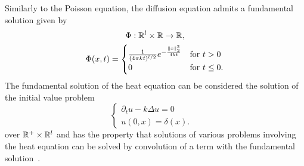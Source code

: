 Similarly to the Poisson equation, the diffusion equation admits a fundamental solution given by
\[
    \begin{gathered}
        \Phi : \mathbb{R}^l \times \mathbb{R} \rightarrow \mathbb{R}, \\
        \Phi(x,t) = 
        \begin{cases}
            \frac{1}{(4\pi k t)^{l/2}} e^{-\frac{\|x\|_2^2}{4kt}} & \text{for } t > 0 \\
            0 & \text{for } t \leq 0.
        \end{cases}
    \end{gathered}
\]
The fundamental solution of the heat equation can be considered the solution of the initial value problem 
\[
    \begin{cases}
        \partial_t u - k \Delta u = 0 & \\
        u(0,x) = \delta(x). &
    \end{cases}
\]
over $\mathbb{R}^+ \times \mathbb{R}^l$ and has the property that solutions of various problems involving the heat equation can be solved by convolution of a term with the fundamental solution~\cite[Chapter 2.3, Theorem 1-2]{Evans2010}.\medskip

